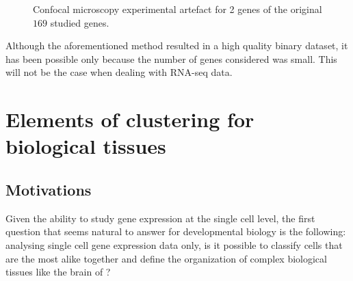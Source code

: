 \begin{figure}[h]
        \myfloatalign
         \quad
        \caption{Confocal microscopy experimental artefact for 2 genes of the original $169$ studied genes.}\label{fig:artefact}
\end{figure}
	
	Although the aforementioned method resulted in a high quality binary dataset, it has been possible only because the number of genes considered was small. This will not be the case when dealing with RNA-seq data.
	
\section{Elements of clustering for biological tissues}
	\subsection{Motivations}
	Given the ability to study gene expression at the single cell level, the first question that seems natural to answer for developmental biology is the following: analysing single cell gene expression data only, is it possible to classify cells that are the most alike together and define the organization of complex biological tissues like the brain of \platyfull{}?\\
	
